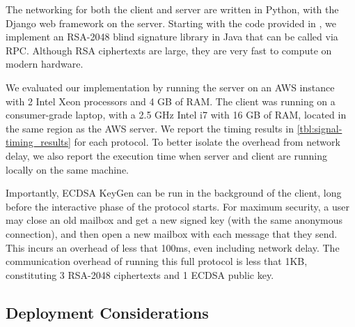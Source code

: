 The networking for both the client and server are written in
Python, with the Django web framework \cite{django} on the server.
Starting with the code provided in \cite{blind_rsa_old_code}, we
implement an RSA-2048 blind signature \cite{C:Chaum82} library in Java that can be called via RPC. Although RSA ciphertexts are large, they are very fast
to compute on modern hardware.%

We evaluated our implementation by running the server on an AWS instance
with 2 Intel Xeon processors and 4 GB of RAM.  The client was running on
a consumer-grade laptop, with a 2.5 GHz Intel i7 with 16 GB of RAM,
located in the same region as the AWS server.
We report the timing results in \cref{tbl:signal-timing_results} for each
protocol.
To better isolate the overhead from network delay, we also report the
execution time when server and client are running locally on the same
machine.

Importantly, ECDSA KeyGen can be run in the background of the client,
long before the interactive phase of the protocol starts.  For maximum
security, a user may close an old mailbox and get a new signed key (with the same anonymous connection), and then
open a new mailbox with each message that they send.  This incurs an
overhead of less that 100ms, even including network delay.  The communication overhead of running this 
full protocol is less that 1KB, constituting 3 RSA-2048 ciphertexts and 1 ECDSA public key.

\subsection{Deployment Considerations}
\label{sec:signal-deployment}

